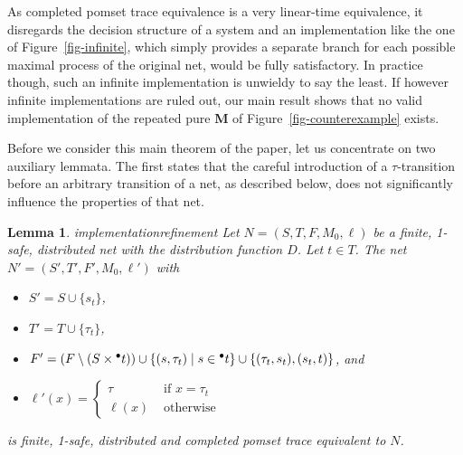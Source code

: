 \documentclass[submission,copyright,creativecommons]{eptcs}
\newtheorem{lemma}{Lemma}
\theoremstyle{definition}
\def\precond#1{{\vphantom{#1}}^\bullet #1}
\def\figurename{Figure}
\newcommand{\reffig}[1]{\figurename~\ref{fig-#1}}
\begin{document}
As completed pomset trace equivalence is a very linear-time equivalence,
it disregards the decision structure of a system and
an implementation like the one of \reffig{infinite}, which simply provides a separate branch for each possible maximal process of the original net, would be fully
satisfactory. In practice though, such an infinite implementation is unwieldy to
say the least. If however infinite implementations are ruled out,
our main result shows that
no valid implementation
of the repeated pure \textbf{M} of \reffig{counterexample} exists.

Before we consider this main theorem of the paper, let us concentrate on two
auxiliary lemmata. The first
states that the careful introduction of a
$\tau$-transition before an arbitrary transition of a net, as described below,
does not significantly influence the properties of that net.

\begin{lemma}{implementationrefinement}{
  Let $N = (S, T, F, M_0, \ell)$ be a finite, 1-safe, distributed net with
  the distribution function $D$. Let $t \in T$.
  }
  The net $N' = (S', T', F', M_0, \ell')$ with
  \begin{itemize}\vspace{-1ex}
    \item $S' = S \cup \{s_t\}$,
    \item $T' = T \cup \{\tau_t\}$,
    \item $F' = (F \setminus (S \times \precond{t})) \cup
      \{(s, \tau_t) \mid s \in \precond{t}\} \cup
      \{(\tau_t, s_t), (s_t, t)\}$, and
    \item $\ell'(x) = \begin{cases}
        \tau&\text{ if } x = \tau_t\\
        \ell(x)&\text{ otherwise}
      \end{cases}$
  \end{itemize}
  is finite, 1-safe, distributed and completed pomset trace equivalent to $N$.
\end{lemma}
\end{document}
